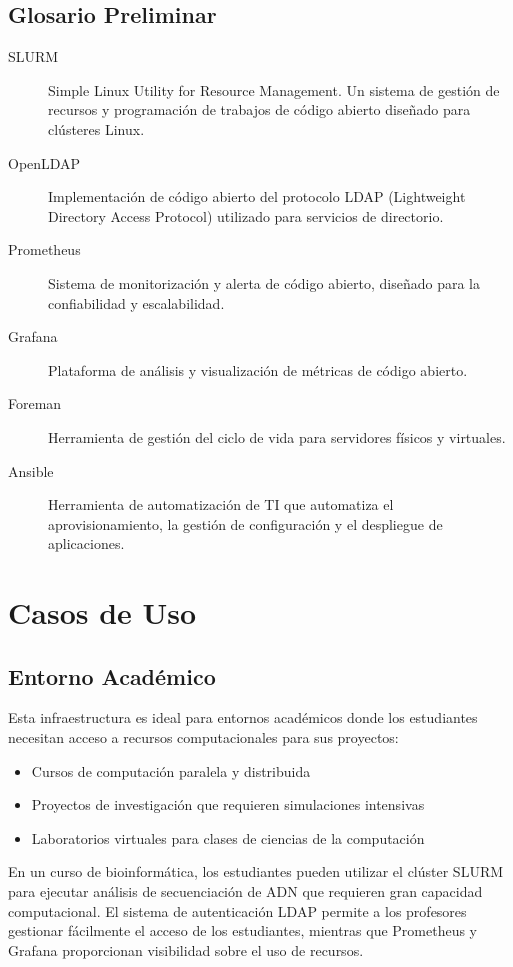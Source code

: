 \documentclass[12pt,a4paper]{article}
\begin{document}
\subsection{Glosario Preliminar}

\begin{description}
    \item[SLURM] Simple Linux Utility for Resource Management. Un sistema de gestión de recursos y programación de trabajos de código abierto diseñado para clústeres Linux.
    \item[OpenLDAP] Implementación de código abierto del protocolo LDAP (Lightweight Directory Access Protocol) utilizado para servicios de directorio.
    \item[Prometheus] Sistema de monitorización y alerta de código abierto, diseñado para la confiabilidad y escalabilidad.
    \item[Grafana] Plataforma de análisis y visualización de métricas de código abierto.
    \item[Foreman] Herramienta de gestión del ciclo de vida para servidores físicos y virtuales.
    \item[Ansible] Herramienta de automatización de TI que automatiza el aprovisionamiento, la gestión de configuración y el despliegue de aplicaciones.
\end{description}

\section{Casos de Uso}

\subsection{Entorno Académico}

Esta infraestructura es ideal para entornos académicos donde los estudiantes necesitan acceso a recursos computacionales para sus proyectos:

\begin{itemize}
    \item Cursos de computación paralela y distribuida
    \item Proyectos de investigación que requieren simulaciones intensivas
    \item Laboratorios virtuales para clases de ciencias de la computación
\end{itemize}

\begin{infobox}
En un curso de bioinformática, los estudiantes pueden utilizar el clúster SLURM para ejecutar análisis de secuenciación de ADN que requieren gran capacidad computacional. El sistema de autenticación LDAP permite a los profesores gestionar fácilmente el acceso de los estudiantes, mientras que Prometheus y Grafana proporcionan visibilidad sobre el uso de recursos.
\end{infobox}
\end{document}
